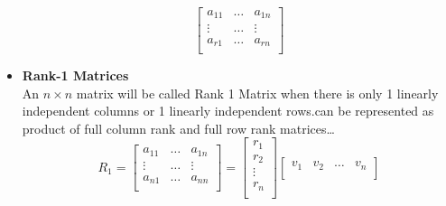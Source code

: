 \documentclass[a4paper]{article}
\numberwithin{equation}{section}
\begin{document}
\begin{itemize}
\[\begin{bmatrix}
                    a_{11} & \dots & a_{1n}\\
                    \vdots & \dots & \vdots \\
                    a_{r1} & \dots & a_{rn}\\
                \end{bmatrix}
            \]
        \vspace{5pt}
        \item \textbf{Rank-1 Matrices}
        \vspace{5pt}\\
        An $n\times n$ matrix will be called Rank 1 Matrix when there is only 1 linearly independent columns or 1 linearly independent rows.can be represented as product of full column rank and full row rank matrices\dots
        \[R_1=
            \begin{bmatrix}
                a_{11} & \dots & a_{1n}\\
                \vdots & \dots & \vdots \\
                a_{n1} & \dots & a_{nn}\\
            \end{bmatrix}=
            \begin{bmatrix}
                r_1\\
                r_2\\
                \vdots\\
                r_n\\
            \end{bmatrix}
            \begin{bmatrix}
                v_1 & v_2 & \dots & v_n\\
            \end{bmatrix}
        \]


\end{itemize}
\end{document}

